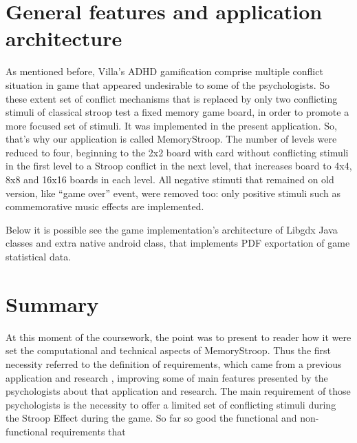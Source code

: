 \section{General features and application architecture}
As mentioned before, Villa's ADHD gamification comprise multiple conflict situation in game that appeared undesirable to some of the psychologists. So these extent set of conflict mechanisms that is replaced by only two conflicting stimuli of classical stroop test a fixed memory game board, in order to promote a more focused set of stimuli. It was implemented in the present application. So, that's why our application is called MemoryStroop. The number of levels were reduced to four, beginning to the 2x2 board with card without conflicting stimuli in the first level to a Stroop conflict in the next level, that increases board to 4x4, 8x8 and 16x16 boards in each level. All negative stimuti that remained on old version, like ``game over'' event, were removed too: only positive stimuli such as commemorative music effects are implemented. 

Below it is possible see the game implementation's architecture of Libgdx Java classes and extra native android class, that implements PDF exportation of game statistical data.

\section{Summary}

At this moment of the coursework, the point was to present to reader how it were set the computational and technical aspects of MemoryStroop. Thus the first necessity referred to the definition of requirements, which came from a previous application and research \citep{Villa}, improving some of main features presented by the psychologists about that application and research. The main requirement of those psychologists is the necessity to offer a limited set of conflicting stimuli during the Stroop Effect during the game. So far so good the functional and non-functional  requirements that